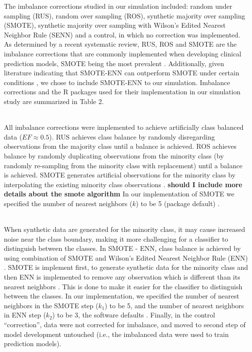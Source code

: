\documentclass[AMA,STIX1COL,]{WileyNJD-v2}
\begin{document}
\hfill\break
The imbalance corrections studied in our simulation included: random
under sampling (RUS), random over sampling (ROS), synthetic majority
over sampling (SMOTE), synthetic majority over sampling with Wilson's
Edited Nearest Neighbor Rule (SENN) and a control, in which no
correction was implemented. As determined by a recent systematic review,
RUS, ROS and SMOTE are the imbalance corrections that are commonly
implemented when developing clinical prediction models, SMOTE being the
most prevalent \citep{constanza}. Additionally, given literature
indicating that SMOTE-ENN can outperform SMOTE under certain conditions
\citep{senn, heart_failure_senn}, we chose to include SMOTE-ENN to our
simulation. Imbalance corrections and the R packages used for their
implementation in our simulation study are summarized in Table 2.\\
\strut \\
All imbalance corrections were implemented to achieve artificially class
balanced data (\(EF \approx 0.5\)). RUS achieves class balance by
randomly disregarding observations from the majority class until a
balance is achieved. ROS achieves balance by randomly duplicating
observations from the minority class (by randomly re-sampling from the
minority class with replacement) until a balance is achieved. SMOTE
generates artificial observations for the minority class by
interpolating the existing minority class observations \citep{chawla}.
\textbf{should I include more details about the smote algorithm} In our
implementation of SMOTE we specified the number of nearest neighbors
(\(k\)) to be 5 (package default) \citep{iric}.\\
\strut \\
When synthetic data are generated for the minority class, it may cause
increased noise near the class boundary, making it more challenging for
a classifier to distinguish between the classes. In SMOTE - ENN, class
balance is achieved by using combination of SMOTE and Wilson's Edited
Nearest Neighbor Rule (ENN) \citep{wilson}. SMOTE is implement first, to
generate synthetic data for the minority class and then ENN is
implemented to remove any observation which is different than its
nearest neighbors \citep{senn}. This is done to make it easier for the
classifier to distinguish between the classes. In our implementation, we
specified the number of nearest neighbors in the SMOTE step (\(k_1\)) to
be 5, and the number of nearest neighbors in ENN step (\(k_2\)) to be 3,
the software defaults \citep{iric}. Finally, in the control
``correction'', data were not corrected for imbalance, and moved to
second step of model development untouched (i.e., the imbalanced data
were used to train prediction models).
\end{document}
